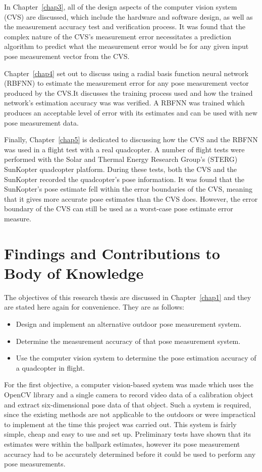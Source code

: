 In Chapter~\ref{chap3}, all of the design aspects of the computer vision system (CVS) are discussed, which include the hardware and software design, as well as the measurement accuracy test and verification process. It was found that the complex nature of the CVS's measurement error necessitates a prediction algorithm to predict what the measurement error would be for any given input pose measurement vector from the CVS.\@ 

Chapter~\ref{chap4} set out to discuss using a radial basis function neural network (RBFNN) to estimate the measurement error for any pose measurement vector produced by the CVS.\@ It discusses the training process used and how the trained network's estimation accuracy was was verified. A RBFNN was trained which produces an acceptable level of error with its estimates and can be used with new pose measurement data.

Finally, Chapter~\ref{chap5} is dedicated to discussing how the CVS and the RBFNN was used in a flight test with a real quadcopter. A number of flight tests were performed with the Solar and Thermal Energy Research Group's (STERG) SunKopter quadcopter platform. During these tests, both the CVS and the SunKopter recorded the quadcopter's pose information. It was found that the SunKopter's pose estimate fell within the error boundaries of the CVS, meaning that it gives more accurate pose estimates than the CVS does. However, the error boundary of the CVS can still be used as a worst-case pose estimate error measure. 

\section{Findings and Contributions to Body of Knowledge}

The objectives of this research thesis are discussed in Chapter~\ref{chap1} and they are stated here again for convenience. They are as follows:

\begin{itemize}
  \item Design and implement an alternative outdoor pose measurement system.
  \item Determine the measurement accuracy of that pose measurement system.
  \item Use the computer vision system to determine the pose estimation accuracy of a quadcopter in flight. 
\end{itemize}

For the first objective, a computer vision-based system was made which uses the OpenCV library and a single camera to record video data of a calibration object and extract six-dimensional pose data of that object. Such a system is required, since the existing methods are not applicable to the outdoors or were impractical to implement at the time this project was carried out. This system is fairly simple, cheap and easy to use and set up. Preliminary tests have shown that its estimates were within the ballpark estimates, however its pose measurement accuracy had to be accurately determined before it could be used to perform any pose measurements. 


